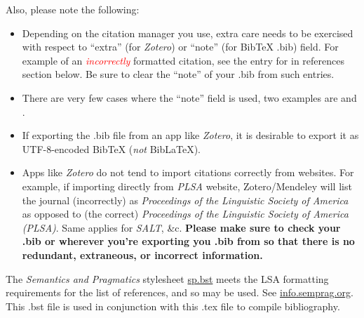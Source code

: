 \documentclass[12pt, letterpaper]{article}
\begin{document}
    Also, please note the following:
    \begin{itemize}
        \item Depending on the citation manager you use, extra care needs to be
            exercised with respect to ``extra'' (for \textit{Zotero}) or ``note''
            (for BibTeX .bib) field. For example of an \textcolor{red}{\textit{incorrectly}}
            formatted citation, see the entry for \cite{sankoff_formal_1981} in references
            section below. Be sure to clear the ``note'' of your .bib from such entries.

        \item There are very few cases where the ``note'' field is used, two
            examples are \cite{ozernyi_linguistic_2022} and
            \cite{ozernyi_rise_2022}.

        \item If exporting the .bib file from an app like \textit{Zotero}, it is
            desirable to export it as UTF-8-encoded BibTeX (\textit{not}
            BibLaTeX).

        \item Apps like \textit{Zotero} do not tend to import citations
            correctly from websites. For example, if importing directly from
            \textit{PLSA} website, Zotero/Mendeley will list the journal (incorrectly)
            as \textit{Proceedings of the Linguistic Society of America} as opposed
            to (the correct) \textit{Proceedings of the Linguistic Society of
            America (PLSA)}. Same applies for \textit{SALT}, \&c. \textbf{Please
            make sure to check your .bib or wherever you're exporting you .bib
            from so that there is no redundant, extraneous, or incorrect
            information.}
    \end{itemize}

    The \textit{Semantics and Pragmatics} stylesheet
    \href{https://raw.githubusercontent.com/semprag/tex/master/sp.bst}{sp.bst}
    meets the LSA formatting requirements for the list of references, and so may be
    used. See \href{http://info.semprag.org}{info.semprag.org}. This .bst file
    is used in conjunction with this .tex file to compile bibliography.

    \setlength{\bibsep}{0pt plus 0.3ex}
    \setlength{\bibhang}{0.3in} %
    \titleformat{\section}{\normalfont\bfseries}{\thesection}{.5em}{} %

    \newcommand{\doi}[1]{\href{https://doi.org/#1}{https://doi.org/#1}} %
\end{document}
